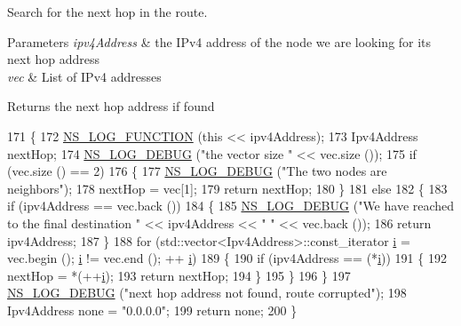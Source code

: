 Search for the next hop in the route. 


\begin{DoxyParams}{Parameters}
{\em ipv4\+Address} & the I\+Pv4 address of the node we are looking for its next hop address \\
\hline
{\em vec} & List of I\+Pv4 addresses \\
\hline
\end{DoxyParams}
\begin{DoxyReturn}{Returns}
the next hop address if found 
\end{DoxyReturn}

\begin{DoxyCode}
171 \{
172   \hyperlink{log-macros-disabled_8h_a90b90d5bad1f39cb1b64923ea94c0761}{NS\_LOG\_FUNCTION} (\textcolor{keyword}{this} << ipv4Address);
173   Ipv4Address nextHop;
174   \hyperlink{group__logging_ga413f1886406d49f59a6a0a89b77b4d0a}{NS\_LOG\_DEBUG} (\textcolor{stringliteral}{"the vector size "} << vec.size ());
175   \textcolor{keywordflow}{if} (vec.size () == 2)
176     \{
177       \hyperlink{group__logging_ga413f1886406d49f59a6a0a89b77b4d0a}{NS\_LOG\_DEBUG} (\textcolor{stringliteral}{"The two nodes are neighbors"});
178       nextHop = vec[1];
179       \textcolor{keywordflow}{return} nextHop;
180     \}
181   \textcolor{keywordflow}{else}
182     \{
183       \textcolor{keywordflow}{if} (ipv4Address == vec.back ())
184         \{
185           \hyperlink{group__logging_ga413f1886406d49f59a6a0a89b77b4d0a}{NS\_LOG\_DEBUG} (\textcolor{stringliteral}{"We have reached to the final destination "} << ipv4Address << \textcolor{stringliteral}{" "} << 
      vec.back ());
186           \textcolor{keywordflow}{return} ipv4Address;
187         \}
188       \textcolor{keywordflow}{for} (std::vector<Ipv4Address>::const\_iterator \hyperlink{bernuolliDistribution_8m_a6f6ccfcf58b31cb6412107d9d5281426}{i} = vec.begin (); \hyperlink{bernuolliDistribution_8m_a6f6ccfcf58b31cb6412107d9d5281426}{i} != vec.end (); ++
      \hyperlink{bernuolliDistribution_8m_a6f6ccfcf58b31cb6412107d9d5281426}{i})
189         \{
190           \textcolor{keywordflow}{if} (ipv4Address == (*\hyperlink{bernuolliDistribution_8m_a6f6ccfcf58b31cb6412107d9d5281426}{i}))
191             \{
192               nextHop = *(++\hyperlink{bernuolliDistribution_8m_a6f6ccfcf58b31cb6412107d9d5281426}{i});
193               \textcolor{keywordflow}{return} nextHop;
194             \}
195         \}
196     \}
197   \hyperlink{group__logging_ga413f1886406d49f59a6a0a89b77b4d0a}{NS\_LOG\_DEBUG} (\textcolor{stringliteral}{"next hop address not found, route corrupted"});
198   Ipv4Address none = \textcolor{stringliteral}{"0.0.0.0"};
199   \textcolor{keywordflow}{return} none;
200 \}
\end{DoxyCode}


